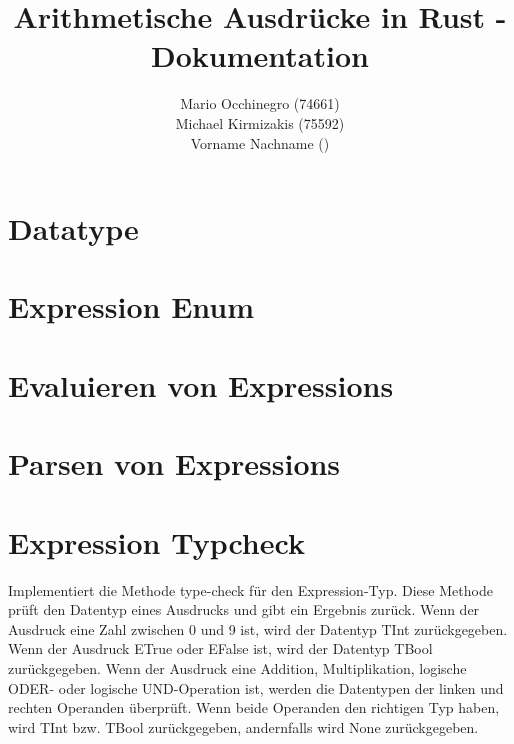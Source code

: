 \documentclass[a4paper, 1ppt]{article}
\title{Arithmetische Ausdrücke in Rust - Dokumentation}
\date{}
\author{
		Mario Occhinegro (74661)\\
		Michael Kirmizakis (75592)\\
		Vorname Nachname ()\\
}
\begin{document}
\nocite{*}
\maketitle
\newpage
\clearpage
\tableofcontents
\setcounter{page}{1}
\newpage
{}
\maketitle
\section{Datatype}
\section{Expression Enum}
\section{Evaluieren von Expressions}
\section{Parsen von Expressions}
\section{Expression Typcheck}
Implementiert die Methode type-check für den Expression-Typ.
Diese Methode prüft den Datentyp eines Ausdrucks und gibt ein Ergebnis zurück.
Wenn der Ausdruck eine Zahl zwischen 0 und 9 ist, wird der Datentyp TInt zurückgegeben.
Wenn der Ausdruck ETrue oder EFalse ist, wird der Datentyp TBool zurückgegeben.
Wenn der Ausdruck eine Addition, Multiplikation, logische ODER- oder logische UND-Operation ist, werden die Datentypen der linken und rechten Operanden überprüft.
Wenn beide Operanden den richtigen Typ haben, wird TInt bzw.
TBool zurückgegeben, andernfalls wird None zurückgegeben.
\end{document}
